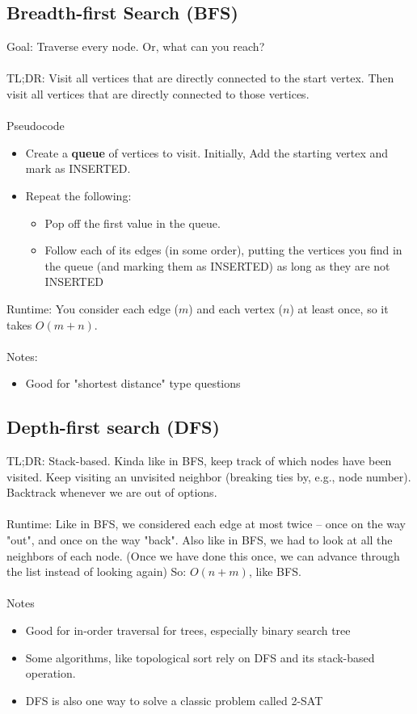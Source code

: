 \documentclass[12pt]{article}
\begin{document}
\subsection*{Breadth-first Search (BFS)}
Goal: Traverse every node. Or, what can you reach? \\\\
TL;DR: Visit all vertices that are directly connected to the start vertex. Then visit all vertices that are directly
connected to those vertices. \\\\
Pseudocode
\begin{itemize}
    \item Create a \textbf{queue} of vertices to visit. Initially, Add the starting vertex and mark as INSERTED.
    \item Repeat the following:
    \begin{itemize}
        \item Pop off the first value in the queue.
        \item Follow each of its edges (in some order), putting the vertices you find in the queue (and marking them as INSERTED) as long as they are not INSERTED
    \end{itemize}
\end{itemize}
Runtime: You consider each edge ($m$) and each vertex ($n$) at least once, so it takes $O(m + n)$. \\\\
Notes:
\begin{itemize}
    \item Good for "shortest distance" type questions
\end{itemize}

\subsection*{Depth-first search (DFS)}
TL;DR: Stack-based. Kinda like in BFS, keep track of which nodes have been visited. Keep visiting an unvisited
neighbor (breaking ties by, e.g., node number). Backtrack whenever we are out of options. \\\\
Runtime: Like in BFS, we considered each edge at most twice –
once on the way "out", and once on the way
"back". Also like in BFS, we had to look at all the neighbors of each node. (Once we have done this once, we can advance through the list instead of looking again) So: $O(n + m)$, like BFS. \\\\
Notes
\begin{itemize}
    \item Good for in-order traversal for trees, especially binary search tree
    \item Some algorithms, like topological sort rely on DFS and its stack-based operation.
    \item DFS is also one way to solve a classic problem called 2-SAT
\end{itemize}
\end{document}
